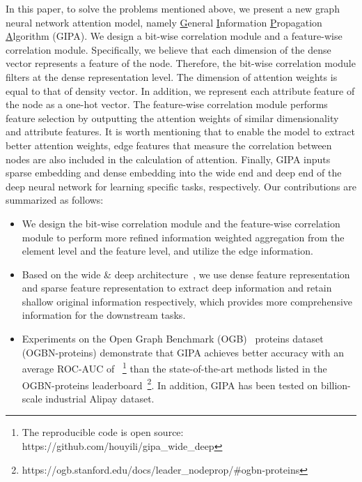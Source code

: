 \documentclass[runningheads]{llncs}
\newcommand{\model}{GIPA\xspace}
\begin{document}
In this paper, to solve the problems mentioned above, we present a new graph neural network attention model, namely \underline{G}eneral \underline{I}nformation \underline{P}ropagation \underline{A}lgorithm (\model). We design a bit-wise correlation module and a feature-wise correlation module. Specifically, we believe that each dimension of the dense vector represents a feature of the node. Therefore, the bit-wise correlation module filters at the dense representation level. The dimension of attention weights is equal to that of density vector. In addition, we represent each attribute feature of the node as a one-hot vector. The feature-wise correlation module performs feature selection by outputting the attention weights of similar dimensionality and attribute features. It is worth mentioning that to enable the model to extract better attention weights, edge features that measure the correlation between nodes are also included in the calculation of attention. Finally, \model inputs sparse embedding and dense embedding into the wide end and deep end of the deep neural network for learning specific tasks, respectively. 
Our contributions are summarized as follows:
\begin{itemize}
  \item[1)]
We design the bit-wise correlation module and the feature-wise correlation module to perform more refined information weighted aggregation from the element level and the feature level, and utilize the edge information.
  \item[2)]
 Based on the wide \& deep architecture~\cite{WideDeep}, we use dense feature representation and sparse feature representation to extract deep information and retain shallow original information respectively, which provides more comprehensive information for the downstream tasks. 
 \item[3)]
 Experiments on the Open Graph Benchmark (OGB)~\cite{hu2020open} proteins dataset (OGBN-proteins) demonstrate that \model achieves better accuracy with an average ROC-AUC of ~\footnote{The reproducible code is open source: https://github.com/houyili/gipa\_wide\_deep} than the state-of-the-art methods listed in the OGBN-proteins leaderboard~\footnote{https://ogb.stanford.edu/docs/leader\_nodeprop/\#ogbn-proteins}.
 In addition, \model has been tested on billion-scale industrial Alipay dataset.
 
\end{itemize}
\end{document}
